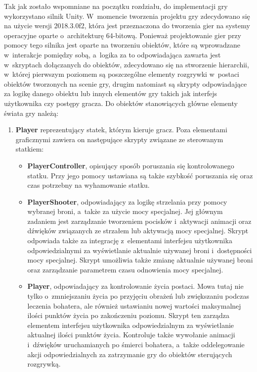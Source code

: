 Tak jak zostało wspomniane na początku rozdziału, do implementacji gry wykorzystano silnik Unity. W~momencie tworzenia projektu gry zdecydowano się na użycie wersji 2018.3.0f2, która jest przeznaczona do tworzenia gier na systemy operacyjne oparte o~architekturę 64-bitową. Ponieważ projektowanie gier przy pomocy tego silnika jest oparte na tworzeniu obiektów, które są wprowadzane w~interakcje pomiędzy sobą, a~logika za to odpowiadająca zawarta jest w~skryptach dołączanych do obiektów, zdecydowano się na stworzenie hierarchii, w~której pierwszym poziomem są poszczególne elementy rozgrywki w~postaci obiektów tworzonych na scenie gry, drugim natomiast są skrypty odpowiadające za logikę danego obiektu lub innych elementów gry takich jak interfejs użytkownika czy postępy gracza. Do obiektów stanowiących główne elementy świata gry należą:
\begin{enumerate}
	\item \textbf{Player} reprezentujący statek, którym kieruje gracz. Poza elementami graficznymi zawiera on następujące skrypty związane ze sterowanym statkiem:
	\begin{itemize}
		\item \textbf{PlayerController}, opisujący sposób poruszania się kontrolowanego statku. Przy jego pomocy ustawiana są także szybkość poruszania się oraz czas potrzebny na wyhamowanie statku.
		\item \textbf{PlayerShooter}, odpowiadający za logikę strzelania przy pomocy wybranej broni, a~także za użycie mocy specjalnej. Jej głównym zadaniem jest zarządzanie tworzeniem pocisków i~aktywacji animacji oraz dźwięków związanych ze strzałem lub aktywacją mocy specjalnej. Skrypt odpowiada także za integrację z~elementami interfejsu użytkownika odpowiedzialnymi za wyświetlanie aktualnie używanej broni i~dostępności mocy specjalnej. Skrypt umożliwia także zmianę aktualnie używanej broni oraz zarządzanie parametrem czasu odnowienia mocy specjalnej. 
		\item \textbf{Player}, odpowiadający za kontrolowanie życia postaci. Mowa tutaj nie tylko o~zmniejszaniu życia po przyjęciu obrażeń lub zwiększaniu podczas leczenia bohatera, ale również ustawianiu nowej wartości maksymalnej ilości punktów życia po zakończeniu poziomu. Skrypt ten zarządza elementem interfejsu użytkownika odpowiedzialnym za wyświetlanie aktualnej ilości punktów życia. Kontroluje także wywołanie animacji i~dźwięków uruchamianych po śmierci bohatera, a~także oddelegowanie akcji odpowiedzialnych za zatrzymanie gry do obiektów sterujących rozgrywką.
	\end{itemize}


\end{enumerate}
